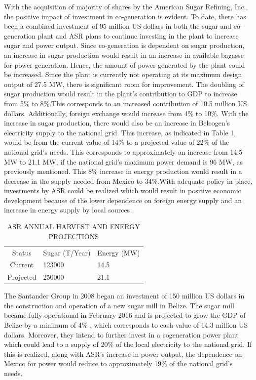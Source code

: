 \documentclass[twocolumn,10pt]{asme2e}
\begin{document}
With the acquisition of majority of shares by the American Sugar Refining, Inc., the positive impact of investment in co-generation is evident. To date, there has been a combined investment of 95 million US dollars in both the sugar and co-generation plant and ASR plans to continue investing in the plant to increase sugar and power output. Since co-generation is dependent on sugar production, an increase in sugar production would result in an increase in available bagasse for power generation. Hence, the amount of power generated by the plant could be increased. Since the plant is currently not operating at its maximum design output of 27.5 MW, there is significant room for improvement. The doubling of sugar production would result in the plant's contribution to GDP to increase from 5\% to 8\%.This corresponds to an increased contribution of 10.5 million US dollars. Additionally, foreign exchange would increase from 4\% to 10\%. With the increase in sugar production, there would also be an increase in Belcogen's electricity supply to the national grid. This increase, as indicated in Table 1, would be from the current value of 14\% to a projected value of 22\% of the national grid's needs. This corresponds to approximately an increase from 14.5 MW to 21.1 MW, if the national grid's maximum power demand is 96 MW, as previously mentioned. This 8\% increase in energy production would result in a decrease in the supply needed from Mexico to 34\%.With adequate policy in place, investments by ASR could be realized which would result in positive economic development because of the lower dependence on foreign energy supply and an increase in energy supply by local sources \cite{asr_report}.
\begin{table}[t]
\caption{ASR ANNUAL HARVEST AND ENERGY PROJECTIONS}
\begin{center}
\label{table_ASME_1}
\begin{tabular}{c l l }
& & \\ %
\hline
Status & Sugar (T/Year) & Energy (MW)\\
\hline
Current & 123000 & 14.5 \\
Projected & 250000 & 21.1 \\
\hline
\end{tabular}
\end{center}
\end{table}

The Santander Group in 2008 began an investment of 150 million US dollars in the construction and operation of a new sugar mill in Belize. The sugar mill became fully operational in February 2016 and is projected to grow the GDP of Belize by a minimum of 4\% \cite{mcnab_santander}, which corresponds to cash value of 14.3 million US dollars. Moreover, they intend to further invest in a cogeneration power plant which could lead to a supply of 20\% of the local electricity to the national grid. If this is realized, along with ASR's increase in power output, the dependence on Mexico for power would reduce to approximately 19\% of the national grid's needs. \\ \\
\end{document}
